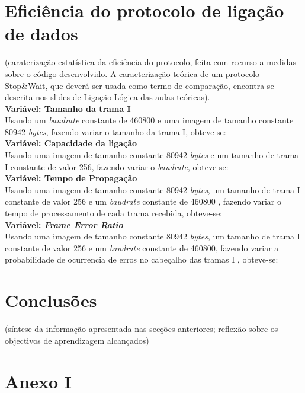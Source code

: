 \documentclass[a4paper, 11pt]{article}
\begin{document}
\section{Eficiência do protocolo de ligação de dados}

(caraterização estatística da  eficiência do protocolo, feita com recurso a medidas sobre o código desenvolvido. A caracterização teórica de um protocolo Stop\&Wait, que deverá ser usada como termo de comparação, encontra-se descrita nos slides de Ligação Lógica das aulas teóricas). \\

\textbf{Variável: Tamanho da trama I}\\
Usando um \textit{baudrate} constante de 460800 e uma imagem de tamanho constante 80942 \textit{bytes}, fazendo variar o tamanho da trama I, obteve-se:\\


\textbf{Variável: Capacidade da ligação}\\
Usando uma imagem de tamanho constante 80942 \textit{bytes} e um tamanho de trama I constante de valor 256, fazendo variar o \textit{baudrate}, obteve-se:\\

\textbf{Variável: Tempo de Propagação}\\
Usando uma imagem de tamanho constante 80942 \textit{bytes}, um tamanho de trama I constante de valor 256 e um \textit{baudrate} constante de 460800 , fazendo variar o tempo de processamento de cada trama recebida, obteve-se:\\

\textbf{Variável: \textit{Frame Error Ratio}}\\
Usando uma imagem de tamanho constante 80942 \textit{bytes}, um tamanho de trama I constante de valor 256 e um \textit{baudrate} constante de 460800, fazendo variar a probabilidade de ocurrencia de erros no cabeçalho das tramas I , obteve-se:\\

\newpage

\section{Conclusões}

  (síntese da informação apresentada nas secções anteriores; reflexão sobre os objectivos de aprendizagem alcançados)
\newpage

\section{Anexo I}
\begin{lstlisting}[language=C]


\end{lstlisting}
\end{document}
